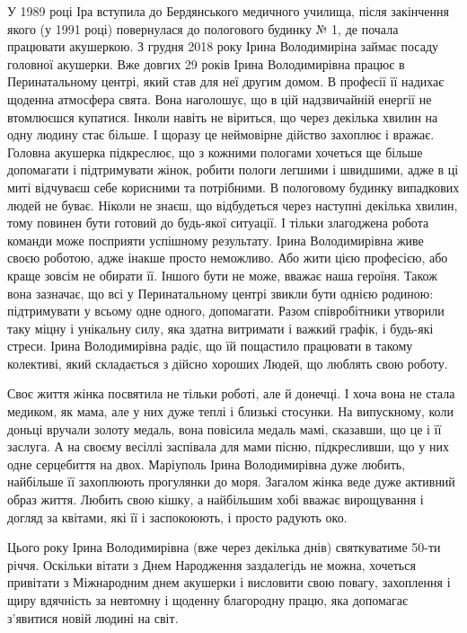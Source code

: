 
У 1989 році Іра вступила до Бердянського медичного училища, після закінчення
якого (у 1991 році) повернулася до пологового будинку № 1, де почала працювати
акушеркою. З грудня 2018 року Ірина Володимиріна займає посаду головної
акушерки. Вже довгих 29 років Ірина Володимирівна працює в Перинатальному
центрі, який став для неї другим домом. В професії її надихає щоденна атмосфера
свята. Вона наголошує, що в цій надзвичайній енергії не втомлюєшся купатися.
Інколи навіть не віриться, що через декілька хвилин на одну людину стає більше.
І щоразу це неймовірне дійство захоплює і вражає. Головна акушерка підкреслює,
що з кожними пологами хочеться ще більше допомагати і підтримувати жінок,
робити пологи легшими і швидшими, адже в ці миті відчуваєш себе корисними та
потрібними. В пологовому будинку випадкових людей не буває. Ніколи не знаєш, що
відбудеться через наступні декілька хвилин, тому повинен бути готовий до
будь-якої ситуації. І тільки злагоджена робота команди може посприяти успішному
результату. Ірина Володимирівна живе своєю роботою, адже інакше просто
неможливо. Або жити цією професією, або краще зовсім не обирати її. Іншого бути
не може, вважає наша героїня. Також вона зазначає, що всі у Перинатальному
центрі звикли бути однією родиною: підтримувати у всьому одне одного,
допомагати. Разом співробітники утворили таку міцну і унікальну силу, яка
здатна витримати і важкий графік, і будь-які стреси. Ірина Володимирівна радіє,
що їй пощастило працювати в такому колективі, який складається з дійсно хороших
Людей, що люблять свою роботу.


Своє життя жінка посвятила не тільки роботі, але й донечці. І хоча вона не
стала медиком, як мама, але у них дуже теплі і близькі стосунки. На випускному,
коли доньці вручали золоту медаль, вона повісила медаль мамі, сказавши, що це і
її заслуга. А на своєму весіллі заспівала для мами пісню, підкресливши, що у
них одне серцебиття на двох. Маріуполь Ірина Володимирівна дуже любить,
найбільше її захоплюють прогулянки до моря. Загалом жінка веде дуже активний
образ життя. Любить свою кішку, а найбільшим хобі вважає вирощування і догляд
за квітами, які її і заспокоюють, і просто радують око.


Цього року Ірина Володимирівна (вже через декілька днів) святкуватиме 50-ти
річчя. Оскільки вітати з Днем Народження заздалегідь не можна, хочеться
привітати з Міжнародним днем акушерки і висловити свою повагу, захоплення і
щиру вдячність за невтомну і щоденну благородну працю, яка допомагає з’явитися
новій людині на світ.

